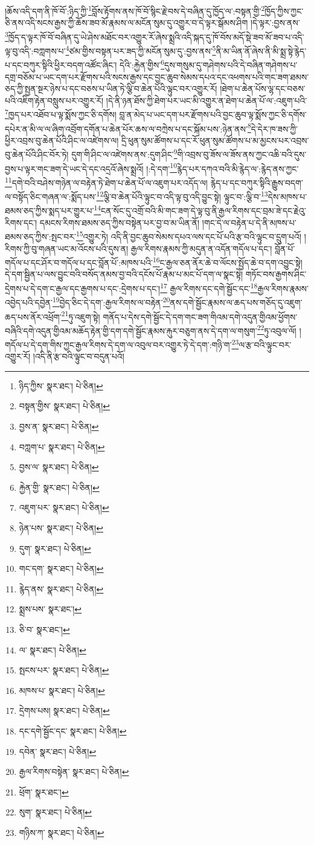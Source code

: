 །ཆོས་འདི་དག་ནི་ཁོ་བོ་:ཉིད་ཀྱི་\footnote{ཉིད་ཀྱིས་  སྣར་ཐང་།  པེ་ཅིན། }བློས་རྟོགས་ནས་ཁོ་བོ་སྙིང་རྗེ་བས་དེ་བཞིན་དུ་ཁྱོད་ལ་:བསྟན་གྱི་\footnote{བསྟན་གྱིས་  སྣར་ཐང་།  པེ་ཅིན། }ཁྱོད་ཀྱིས་ཀྱང་ཅི་ནས་འདི་སངས་རྒྱས་ཀྱི་ཆོས་ཟབ་མོ་རྣམས་ལ་མངོན་སུམ་དུ་འགྱུར་བ་དེ་ལྟར་སྒོམས་ཤིག །དེ་ལྟར་:བྱས་ནས་\footnote{བྱས་ན་  སྣར་ཐང་།  པེ་ཅིན། }ཁྱོད་ད་ལྟར་ཁོ་བོ་བཞིན་དུ་ཡེ་ཤེས་མཐོང་བར་འགྱུར་རོ་ཞེས་སྨྲའི་འདི་སྐད་དུ་ཁོ་བོས་མདོ་སྡེ་ཟབ་མོ་ཟབ་པ་འདི་ལྟ་བུ་འདི་:བཀླགས་པ་\footnote{བཀླག་པ་  སྣར་ཐང་།  པེ་ཅིན། }ཙམ་གྱིས་བསྟན་པར་ཟད་ཀྱི་མངོན་སུམ་དུ་:བྱས་ནས་\footnote{བྱས་ལ་  སྣར་ཐང་།  པེ་ཅིན། }ནི་མ་ཡིན་ནོ་ཞེས་ནི་མི་སྨྲ་སྟེ་རྙེད་པ་དང་བཀུར་སྟིའི་ཕྱིར་བདག་འཚོང་ཞིང་། དེའི་:རྐྱེན་གྱིས་\footnote{རྐྱེན་གྱི་  སྣར་ཐང་།  པེ་ཅིན། }དུས་གསུམ་དུ་གཤེགས་པའི་དེ་བཞིན་གཤེགས་པ་དགྲ་བཅོམ་པ་ཡང་དག་པར་རྫོགས་པའི་སངས་རྒྱས་དང་བྱང་ཆུབ་སེམས་དཔའ་དང་འཕགས་པའི་གང་ཟག་ཐམས་ཅད་ཀྱི་སྤྱན་སྔར་ཉེས་པ་དང་བཅས་པ་ཡིན་ཏེ་ལྕི་བ་ཆེན་པོའི་ལྟུང་བར་འགྱུར་རོ། །ཐེག་པ་ཆེན་པོས་ལྷ་དང་བཅས་པའི་འཇིག་རྟེན་བསླུས་པར་འགྱུར་རོ། །དེ་ནི་ཉན་ཐོས་ཀྱི་ཐེག་པར་ཡང་མི་འགྱུར་ན་ཐེག་པ་ཆེན་པོ་ལ་:འཇུག་པའི་\footnote{འཇུག་པར་  སྣར་ཐང་།  པེ་ཅིན། }ཁྱད་པར་འཐོབ་པ་ལྟ་སྨོས་ཀྱང་ཅི་དགོས། བླ་ན་མེད་པ་ཡང་དག་པར་རྫོགས་པའི་བྱང་ཆུབ་ལྟ་སྨོས་ཀྱང་ཅི་དགོས་དཔེར་ན་མི་ལ་ལ་ཞིག་འབྲོག་དགོན་པ་ཆེན་པོར་ཆས་ལ་བཀྲེས་པ་དང་སྐོམ་པས་:ཉེན་ནས་\footnote{ཉེན་པས་  སྣར་ཐང་།  པེ་ཅིན། }དེ་དེར་ཁ་ཟས་ཀྱི་ཕྱིར་འབྲས་བུ་ཆེན་པོའི་ཤིང་ལ་འཛེགས་ལ། དྲི་ཕུན་སུམ་ཚོགས་པ་དང་རོ་ཕུན་སུམ་ཚོགས་པ་མ་མྱངས་པར་འབྲས་བུ་ཆེན་པོའི་ཤིང་བོར་ཏེ། དུག་གི་ཤིང་ལ་འཛེགས་ནས་:དུག་ཤིང་\footnote{དུག་  སྣར་ཐང་།  པེ་ཅིན། }གི་འབྲས་བུ་ཟོས་ལ་ཟོས་ནས་ཀྱང་འཆི་བའི་དུས་བྱས་པ་ལྟར་གང་ཟག་དེ་ཡང་དེ་དང་འདྲའོ་ཞེས་སྨྲའོ། །:དེ་དག་\footnote{གང་དག་  སྣར་ཐང་།  པེ་ཅིན། }རྙེད་པར་དཀའ་བའི་མི་རྙེད་ལ་:རྙེད་ནས་ཀྱང་\footnote{རྙེད་ནས་  སྣར་ཐང་།  པེ་ཅིན། }དགེ་བའི་བཤེས་གཉེན་ལ་བརྟེན་ཏེ་ཐེག་པ་ཆེན་པོ་ལ་འཇུག་པར་འདོད་ལ། རྙེད་པ་དང་བཀུར་སྟིའི་རྒྱུས་བདག་ལ་བསྟོད་ཅིང་གཞན་ལ་:སྨོད་པས་\footnote{སྨྲས་པས་  སྣར་ཐང་། }ལྕི་བ་ཆེན་པོའི་ལྟུང་བ་འདི་ལྟ་བུ་འདི་བྱུང་སྟེ། ལྟུང་བ་:ལྕི་བ་\footnote{ཅི་བ་  སྣར་ཐང་། }དེས་མཁས་པ་ཐམས་ཅད་ཀྱིས་སྨད་པར་གྱུར་པ་\footnote{ལ་  སྣར་ཐང་།  པེ་ཅིན། }ངན་སོང་དུ་འགྲོ་བའི་མི་གང་ཟག་དེ་ལྟ་བུ་ནི་རྒྱལ་རིགས་དང་བྲམ་ཟེ་དང་རྗེའུ་རིགས་དང་། དམངས་རིགས་ཐམས་ཅད་ཀྱིས་བསྟེན་པར་བྱ་བ་མ་ཡིན་ནོ། །གང་དེ་ལ་བརྟེན་པ་དེ་ནི་མཁས་པ་ཐམས་ཅད་ཀྱིས་:སྤང་བར་\footnote{སྤངས་པར་  སྣར་ཐང་།  པེ་ཅིན། }འགྱུར་ཏེ། འདི་ནི་བྱང་ཆུབ་སེམས་དཔའ་ལས་དང་པོ་པའི་རྩ་བའི་ལྟུང་བ་དྲུག་པའོ། །རིགས་ཀྱི་བུ་གཞན་ཡང་མ་འོངས་པའི་དུས་ན། རྒྱལ་རིགས་རྣམས་ཀྱི་མདུན་ན་འདོན་གདོལ་པ་དང་། བློན་པོ་གདོལ་པ་དང་ཤོར་བ་གདོལ་པ་དང་བློན་པོ་:མཁས་པའི་\footnote{མཁས་པ་  སྣར་ཐང་།  པེ་ཅིན། }ང་རྒྱལ་ཅན་ནོར་ཆེ་བ་ལོངས་སྤྱོད་ཆེ་བ་དག་འབྱུང་སྟེ། དེ་དག་སྦྱིན་པ་ལས་བྱུང་བའི་བསོད་ནམས་བྱ་བའི་དངོས་པོ་རྣམ་པ་མང་པོ་དག་ལ་སྣང་སྟེ། གཏོང་བས་རྒྱགས་ཤིང་དྲེགས་པ་དེ་དག་ང་རྒྱལ་དང་རྒྱགས་པ་དང་:དྲེགས་པ་དང་།\footnote{དྲེགས་པས།  སྣར་ཐང་།  པེ་ཅིན། } རྒྱལ་རིགས་དང་དགེ་སྦྱོང་དང་\footnote{དང་དགེ་སྦྱོང་དང་  སྣར་ཐང་།  པེ་ཅིན། }རྒྱལ་རིགས་རྣམས་འབྱེད་པའི་དབྱེན་\footnote{དབེན་  སྣར་ཐང་།  པེ་ཅིན། }བྱེད་ཅིང་དེ་དག་:རྒྱལ་རིགས་ལ་བརྟེན་\footnote{རྒྱལ་རིགས་བསྟེན་  སྣར་ཐང་།  པེ་ཅིན། }ནས་དགེ་སྦྱོང་རྣམས་ལ་ཆད་པས་གཅོད་དུ་འཇུག་ཆད་པས་ནོར་འཕྲོག་\footnote{ཕྲོག་  སྣར་ཐང་། }ཏུ་འཇུག་སྟེ། གནོད་པ་དེས་དགེ་སྦྱོང་དེ་དག་གང་ཟག་གིའམ་དགེ་འདུན་གྱིའམ་ཕྱོགས་བཞིའི་དགེ་འདུན་གྱིའམ་མཆོད་རྟེན་གྱི་དག་དགེ་སྦྱོང་རྣམས་རྐུར་བཅུག་ནས་དེ་དག་ལ་གསུག་\footnote{སུག་  སྣར་ཐང་།  པེ་ཅིན། }ཏུ་འབུལ་ལོ། །གདོལ་པ་དེ་དག་གིས་ཀྱང་རྒྱལ་རིགས་དེ་དག་ལ་འབུལ་བར་འགྱུར་ཏེ་དེ་དག་:གཉི་ག་\footnote{གཉིས་ཀ་  སྣར་ཐང་།  པེ་ཅིན། }ལ་རྩ་བའི་ལྟུང་བར་འགྱུར་རོ། །འདི་ནི་རྩ་བའི་ལྟུང་བ་བདུན་པའོ། 
